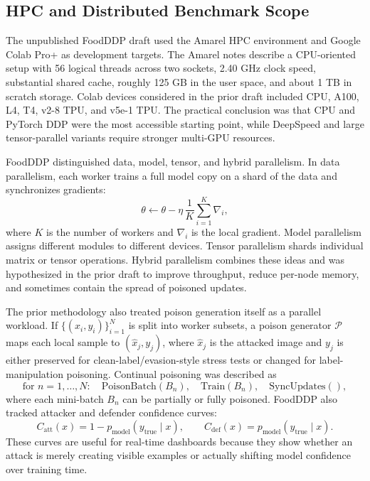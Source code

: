 \documentclass[conference]{IEEEtran}
\begin{document}
\subsection{HPC and Distributed Benchmark Scope}

The unpublished FoodDDP draft used the Amarel HPC environment and Google Colab Pro+ as development targets. The Amarel notes describe a CPU-oriented setup with 56 logical threads across two sockets, 2.40 GHz clock speed, substantial shared cache, roughly 125 GB in the user space, and about 1 TB in scratch storage. Colab devices considered in the prior draft included CPU, A100, L4, T4, v2-8 TPU, and v5e-1 TPU. The practical conclusion was that CPU and PyTorch DDP were the most accessible starting point, while DeepSpeed and large tensor-parallel variants require stronger multi-GPU resources.

FoodDDP distinguished data, model, tensor, and hybrid parallelism. In data parallelism, each worker trains a full model copy on a shard of the data and synchronizes gradients:
\begin{equation}
\theta \leftarrow \theta-\eta\,\frac{1}{K}\sum_{i=1}^{K}\nabla_i ,
\end{equation}
where \(K\) is the number of workers and \(\nabla_i\) is the local gradient. Model parallelism assigns different modules to different devices. Tensor parallelism shards individual matrix or tensor operations. Hybrid parallelism combines these ideas and was hypothesized in the prior draft to improve throughput, reduce per-node memory, and sometimes contain the spread of poisoned updates.

The prior methodology also treated poison generation itself as a parallel workload. If \(\{(x_i,y_i)\}_{i=1}^{N}\) is split into worker subsets, a poison generator \(\mathcal{P}\) maps each local sample to \((\hat{x}_j,y_j)\), where \(\hat{x}_j\) is the attacked image and \(y_j\) is either preserved for clean-label/evasion-style stress tests or changed for label-manipulation poisoning. Continual poisoning was described as
\[
\text{for } n=1,\ldots,N:\quad \text{PoisonBatch}(B_n),\quad \text{Train}(B_n),\quad \text{SyncUpdates}(),
\]
where each mini-batch \(B_n\) can be partially or fully poisoned. FoodDDP also tracked attacker and defender confidence curves:
\[
C_{\mathrm{att}}(x)=1-p_{\mathrm{model}}(y_{\mathrm{true}}\mid x),\qquad
C_{\mathrm{def}}(x)=p_{\mathrm{model}}(y_{\mathrm{true}}\mid x).
\]
These curves are useful for real-time dashboards because they show whether an attack is merely creating visible examples or actually shifting model confidence over training time.
\end{document}
